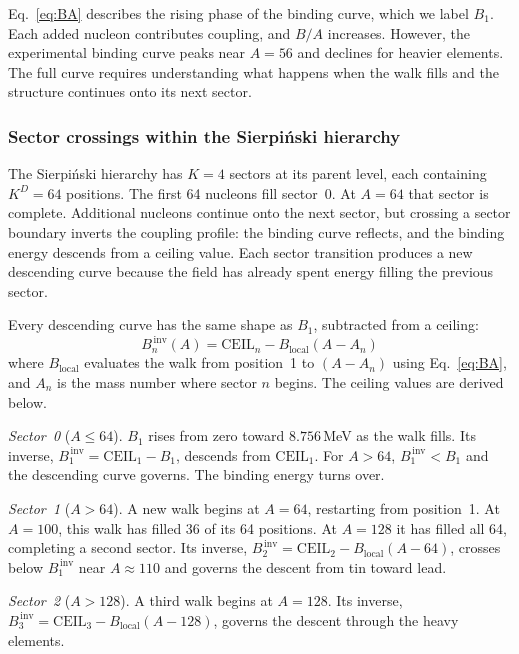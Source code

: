 \documentclass[fleqn,usenatbib]{mnras}
\begin{document}
Eq.~\ref{eq:BA} describes the rising phase of the binding curve, which we label $B_1$. Each added nucleon contributes coupling, and $B/A$ increases. However, the experimental binding curve peaks near $A = 56$ and declines for heavier elements. The full curve requires understanding what happens when the walk fills and the structure continues onto its next sector.

\subsubsection{Sector crossings within the Sierpi\'nski hierarchy}
\label{sec:faces}

The Sierpi\'nski hierarchy has $K = 4$ sectors at its parent level, each containing $K^D = 64$ positions. The first 64 nucleons fill sector~0. At $A = 64$ that sector is complete. Additional nucleons continue onto the next sector, but crossing a sector boundary inverts the coupling profile: the binding curve reflects, and the binding energy descends from a ceiling value. Each sector transition produces a new descending curve because the field has already spent energy filling the previous sector.

Every descending curve has the same shape as $B_1$, subtracted from a ceiling:
\begin{equation}
B_{n}^{\,\mathrm{inv}}(A) = \mathrm{CEIL}_n - B_{\mathrm{local}}(A - A_n)
\end{equation}
where $B_{\mathrm{local}}$ evaluates the walk from position~1 to $(A - A_n)$ using Eq.~\ref{eq:BA}, and $A_n$ is the mass number where sector $n$ begins. The ceiling values are derived below.

\emph{Sector~0} ($A \leq 64$). $B_1$ rises from zero toward $8.756$\,MeV as the walk fills. Its inverse, $B_1^{\,\mathrm{inv}} = \mathrm{CEIL}_1 - B_1$, descends from $\mathrm{CEIL}_1$. For $A > 64$, $B_1^{\,\mathrm{inv}} < B_1$ and the descending curve governs. The binding energy turns over.

\emph{Sector~1} ($A > 64$). A new walk begins at $A = 64$, restarting from position~1. At $A = 100$, this walk has filled 36 of its 64 positions. At $A = 128$ it has filled all 64, completing a second sector. Its inverse, $B_2^{\,\mathrm{inv}} = \mathrm{CEIL}_2 - B_{\mathrm{local}}(A - 64)$, crosses below $B_1^{\,\mathrm{inv}}$ near $A \approx 110$ and governs the descent from tin toward lead.

\emph{Sector~2} ($A > 128$). A third walk begins at $A = 128$. Its inverse, $B_3^{\,\mathrm{inv}} = \mathrm{CEIL}_3 - B_{\mathrm{local}}(A - 128)$, governs the descent through the heavy elements.
\end{document}
